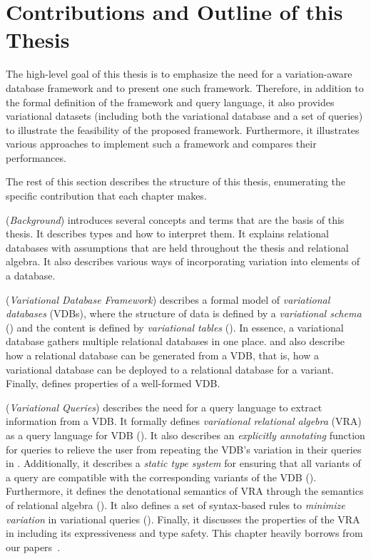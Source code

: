 \section{Contributions and Outline of this Thesis}
\label{sec:contribution}

The high-level goal of this thesis is to emphasize the need for a variation-aware database
framework and to present one such framework. Therefore, in addition to the formal 
definition of the framework and query language, it also provides variational datasets 
(including both the variational database and a set of queries) to illustrate the feasibility
of the proposed framework. Furthermore, it illustrates various approaches to implement
such a framework and compares their performances.

The rest of this section describes the structure of this thesis, enumerating the specific 
contribution that each chapter makes. 

 (\emph{Background}) introduces several concepts and terms that are the 
basis of this thesis. It describes types and how to interpret them. It explains relational
databases with assumptions that are held throughout the thesis and relational algebra. 
It also describes various ways of incorporating variation
into elements of a database. 

 (\emph{Variational Database Framework}) describes a formal model of
\emph{variational databases} (VDBs), where the structure of data
is defined by a \emph{variational schema} () and the content is defined
by \emph{variational tables} ().
In essence, a variational database gathers multiple relational databases in one place.
 and  also describe how a relational database can be generated
from a VDB, that is, how a variational database can be deployed to a relational database for a variant.
Finally,  defines properties of a well-formed VDB.

 (\emph{Variational Queries}) describes the need for a query language 
to extract information from a VDB. It formally defines 
\emph{variational relational algebra} (VRA) as a query language for
VDB ().
%
It also describes an \emph{explicitly annotating}  function for queries to relieve the 
user from repeating the VDB's variation in their queries in .
%
Additionally, it describes a \emph{static type system} for ensuring that all variants of a query are
compatible with the corresponding variants of the VDB ().
% 
Furthermore, it defines the denotational semantics of VRA through the semantics of
relational algebra ().
%
It also defines a set of syntax-based rules to \emph{minimize variation} in 
variational queries ().
%
Finally, it discusses the properties of the VRA in  including its expressiveness and 
type safety. 
%
This chapter heavily borrows from our papers~\cite{ATW17dbpl, ATW18poly, vldbArXiv}.


